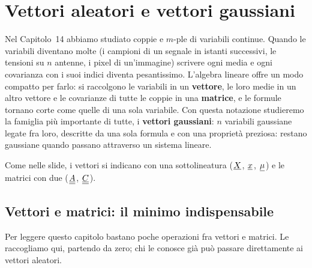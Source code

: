 \chapter{Vettori aleatori e vettori gaussiani}

Nel Capitolo~14 abbiamo studiato coppie e $m$-ple di variabili continue. Quando le variabili diventano molte (i
campioni di un segnale in istanti successivi, le tensioni su $n$ antenne, i pixel di un'immagine) scrivere ogni media e
ogni covarianza con i suoi indici diventa pesantissimo. L'algebra lineare offre un modo compatto per farlo: si
raccolgono le variabili in un \textbf{vettore}, le loro medie in un altro vettore e le covarianze di tutte le coppie in
una \textbf{matrice}, e le formule tornano corte come quelle di una sola variabile. Con questa notazione studieremo la
famiglia più importante di tutte, i \textbf{vettori gaussiani}: $n$ variabili gaussiane legate fra loro, descritte da una
sola formula e con una proprietà preziosa: restano gaussiane quando passano attraverso un sistema lineare.

Come nelle slide, i vettori si indicano con una sottolineatura (${\mkern1mu\underline{X}\mkern1mu}$, ${\mkern1mu\underline{x}\mkern1mu}$, ${\mkern1mu\underline{\mu}\mkern1mu}$) e le matrici
con due (${\mkern1mu\underline{\underline{A}}\mkern1mu}$, ${\mkern1mu\underline{\underline{C}}\mkern1mu}$).

\section{Vettori e matrici: il minimo indispensabile}

Per leggere questo capitolo bastano poche operazioni fra vettori e matrici. Le raccogliamo qui, partendo da zero; chi
le conosce già può passare direttamente ai vettori aleatori.

